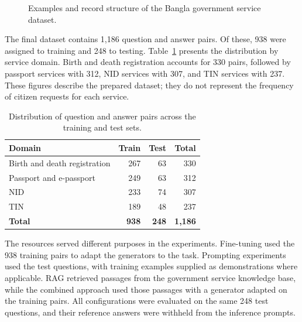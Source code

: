 \documentclass[10pt,journal,compsoc]{IEEEtran}
\begin{document}
\begin{figure}[!t]
\centering
\caption{Examples and record structure of the Bangla government service dataset.}
\label{fig:dataset_examples}
\end{figure}

The final dataset contains 1,186 question and answer pairs. Of these, 938 were assigned to training and 248 to testing. Table~\ref{tab:dataset_summary} presents the distribution by service domain. Birth and death registration accounts for 330 pairs, followed by passport services with 312, NID services with 307, and TIN services with 237. These figures describe the prepared dataset; they do not represent the frequency of citizen requests for each service.

\begin{table}[!t]
\centering
\caption{Distribution of question and answer pairs across the training and test sets.}
\label{tab:dataset_summary}
\footnotesize
\setlength{\tabcolsep}{3pt}
\renewcommand{\arraystretch}{1.1}
\begin{tabular}{lrrr}
\hline
\textbf{Domain} & \textbf{Train} & \textbf{Test} & \textbf{Total} \\
\hline
Birth and death registration & 267 & 63 & 330 \\
Passport and e-passport & 249 & 63 & 312 \\
NID & 233 & 74 & 307 \\
TIN & 189 & 48 & 237 \\
\hline
\textbf{Total} & \textbf{938} & \textbf{248} & \textbf{1,186} \\
\hline
\end{tabular}
\end{table}

The resources served different purposes in the experiments. Fine-tuning used the 938 training pairs to adapt the generators to the task. Prompting experiments used the test questions, with training examples supplied as demonstrations where applicable. RAG retrieved passages from the government service knowledge base, while the combined approach used those passages with a generator adapted on the training pairs. All configurations were evaluated on the same 248 test questions, and their reference answers were withheld from the inference prompts.
\end{document}
